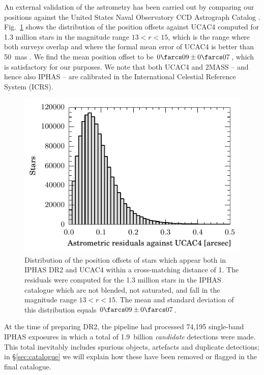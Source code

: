 \documentclass[a4paper,useAMS,usenatbib]{mn2e}
\begin{document}
{An external validation of the astrometry 
has been carried out by comparing our positions against the
United States Naval Observatory CCD Astrograph Catalog 
\citep[UCAC4;][]{UCAC4}.
Fig.~\ref{fig:astrometry} shows the distribution
of the position offsets against UCAC4
computed for 1.3 million stars
in the magnitude range $13 < r < 15$,
which is the range where both surveys overlap
and where the formal mean error of UCAC4
is better than 50~mas \citep{UCAC3}.
We find the mean position offset to be $0\farcs 09\pm0\farcs 07$,
which is satisfactory for our purposes.
We note that both UCAC4 and 2MASS -- and hence also IPHAS --
are calibrated in the International Celestial Reference System (ICRS).

\begin{figure}
    \includegraphics[width=\linewidth]{figures/astrometry/astrometry.pdf} 
    \caption{Distribution of the position offsets
    		of stars
    		which appear both in IPHAS DR2 and UCAC4
    		within a cross-matching distance of 1\arcsec.
            The residuals were computed for 
            the 1.3 million stars in the IPHAS catalogue
            which are not blended, not saturated,
            and fall in the magnitude range $13 < r < 15$.
            The mean and standard deviation of this distribution 
            equals $0\farcs 09\pm0\farcs 07$.}
    \label{fig:astrometry}
\end{figure}

At the time of preparing DR2,
the pipeline had processed
74,195 single-band IPHAS exposures 
in which a total of 1.9~billion \emph{candidate} detections
were made.
This total inevitably includes spurious objects, artefacts and
duplicate detections;
in \S\ref{sec:catalogue} we will explain
how these have been removed or flagged in the final catalogue.

}
\end{document}
